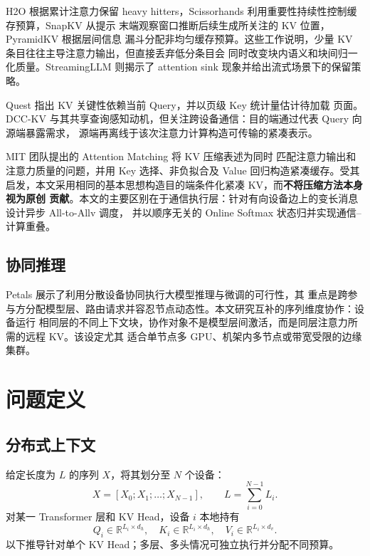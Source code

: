 \documentclass[sigconf,nonacm]{acmart}
\begin{document}
H2O \cite{zhang2023h2o} 根据累计注意力保留 heavy hitters，Scissorhands
\cite{liu2023scissorhands} 利用重要性持续性控制缓存预算，SnapKV \cite{li2024snapkv} 从提示
末端观察窗口推断后续生成所关注的 KV 位置，PyramidKV \cite{cai2024pyramidkv} 根据层间信息
漏斗分配非均匀缓存预算。这些工作说明，少量 KV 条目往往主导注意力输出，但直接丢弃低分条目会
同时改变块内语义和块间归一化质量。StreamingLLM \cite{xiao2024streamingllm} 则揭示了
attention sink 现象并给出流式场景下的保留策略。

Quest \cite{tang2024quest} 指出 KV 关键性依赖当前 Query，并以页级 Key 统计量估计待加载
页面。DCC-KV 与其共享查询感知动机，但关注跨设备通信：目的端通过代表 Query 向源端暴露需求，
源端再离线于该次注意力计算构造可传输的紧凑表示。

MIT 团队提出的 Attention Matching \cite{zweiger2026attentionmatching} 将 KV 压缩表述为同时
匹配注意力输出和注意力质量的问题，并用 Key 选择、非负拟合及 Value 回归构造紧凑缓存。受其
启发，本文采用相同的基本思想构造目的端条件化紧凑 KV，而\textbf{不将压缩方法本身视为原创
贡献}。本文的主要区别在于通信执行层：针对有向设备边上的变长消息设计异步 All-to-Allv 调度，
并以顺序无关的 Online Softmax 状态归并实现通信--计算重叠。

\subsection{协同推理}

Petals \cite{borzunov2023petals} 展示了利用分散设备协同执行大模型推理与微调的可行性，其
重点是跨参与方分配模型层、路由请求并容忍节点动态性。本文研究互补的序列维度协作：设备运行
相同层的不同上下文块，协作对象不是模型层间激活，而是同层注意力所需的远程 KV。该设定尤其
适合单节点多 GPU、机架内多节点或带宽受限的边缘集群。

\section{问题定义}
\label{sec:problem}

\subsection{分布式上下文}

给定长度为 $L$ 的序列 $X$，将其划分至 $N$ 个设备：
\begin{equation}
X = [X_0; X_1; \ldots; X_{N-1}], \qquad L = \sum_{i=0}^{N-1} L_i .
\label{eq:split-seq}
\end{equation}
对某一 Transformer 层和 KV Head，设备 $i$ 本地持有
\begin{equation}
Q_i \in \mathbb{R}^{L_i \times d_h},\quad
K_i \in \mathbb{R}^{L_i \times d_h},\quad
V_i \in \mathbb{R}^{L_i \times d_v}.
\label{eq:local-qkv}
\end{equation}
以下推导针对单个 KV Head；多层、多头情况可独立执行并分配不同预算。
\end{document}

